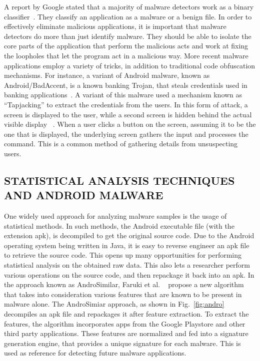 A report by Google stated that a majority of malware detectors work as a binary classifier~\cite{google}. They classify an application as a malware or a benign file. In order to effectively eliminate malicious applications, it is important that malware detectors do more than just identify malware. They should be able to isolate the core parts of the application that perform the malicious acts and work at fixing the loopholes that let the program act in a malicious way. More recent malware applications employ a variety of tricks, in addition to traditional code obfuscation mechanisms. For instance, a variant of Android malware, known as Android/BadAccent, is a known banking Trojan, that steals credentials used in banking applications~\cite{rasthofer2015}. A variant of this malware used a mechanism known as “Tapjacking” to extract the credentials from the users. In this form of attack, a screen is displayed to the user, while a second screen is hidden behind the actual visible display ~\cite{chen2014peeking}. When a user clicks a button on the screen, assuming it to be the one that is displayed, the underlying screen gathers the input and processes the command.  This is a common method of gathering details from unsuspecting users.


\subsection{STATISTICAL ANALYSIS TECHNIQUES AND ANDROID MALWARE}

One widely used approach for analyzing malware samples is the usage of statistical methods. In such methods, the Android executable file (with the extension apk), is decompiled to get the original source code. Due to the Android operating system being written in Java, it is easy to reverse engineer an apk file to retrieve the source code. This opens up many opportunities for performing statistical analysis on the obtained raw data. This also lets a researcher perform various operations on the source code, and then repackage it back into an apk. In the approach known as AndroSimilar, Faruki et al. ~\cite{androsimilar} propose a new algorithm that takes into consideration various features that are known to be present in malware alone. The AndroSimiar approach, as shown in Fig.~\ref{fig:andro} decompiles an apk file and repackages it after feature extraction. To extract the features, the algorithm incorporates apps from the Google Playstore and other third party applications. These features are normalized and fed into a signature generation engine, that provides a unique signature for each malware. This is used as reference for detecting future malware applications.


